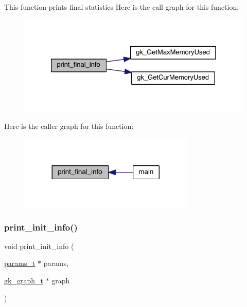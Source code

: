 This function prints final statistics Here is the call graph for this function\+:\nopagebreak
\begin{figure}[H]
\begin{center}
\leavevmode
\includegraphics[width=326pt]{a00149_a702976a4c55992ddbfc1918ec1b70943_cgraph}
\end{center}
\end{figure}
Here is the caller graph for this function\+:\nopagebreak
\begin{figure}[H]
\begin{center}
\leavevmode
\includegraphics[width=236pt]{a00149_a702976a4c55992ddbfc1918ec1b70943_icgraph}
\end{center}
\end{figure}
\mbox{\label{a00149_a4598b170c85571dc5cabc5cf4c0a960f}} 
\subsubsection{\texorpdfstring{print\+\_\+init\+\_\+info()}{print\_init\_info()}}
{\footnotesize\ttfamily void print\+\_\+init\+\_\+info (\begin{DoxyParamCaption}\item[{\hyperlink{a00706}{params\+\_\+t} $\ast$}]{params,  }\item[{\hyperlink{a00638}{gk\+\_\+graph\+\_\+t} $\ast$}]{graph }\end{DoxyParamCaption})}

